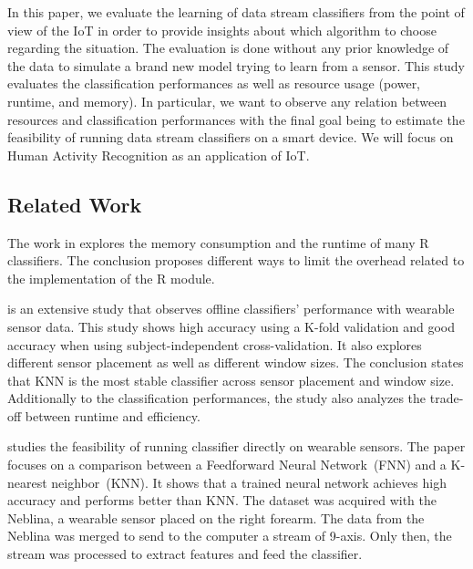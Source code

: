 In this paper, we evaluate the learning of data stream classifiers from the
point of view of the IoT in order to provide insights about which algorithm
to choose regarding the situation. The evaluation is done without any prior
knowledge of the data to simulate a brand new model trying to learn from a
sensor. This study evaluates the classification performances as well as
resource usage (power, runtime, and memory). In particular, we want to observe
any relation between resources and classification performances with the final
goal being to estimate the feasibility of running data stream classifiers on a
smart device. We will focus on Human Activity Recognition as an application of IoT.


\subsection{Related Work}
The work in \cite{memory_consumption_machine_learning}
explores the memory consumption and
the runtime of many R classifiers. The conclusion proposes different ways to
limit the overhead related to the implementation of the R module.

\cite{Janidarmian_2017} is an extensive study that
observes offline classifiers' performance with
wearable sensor data. This study shows high
accuracy using a K-fold validation and good
accuracy when using subject-independent
cross-validation. It also explores different
sensor placement as well as different window
sizes. The conclusion states that KNN is the most
stable classifier across sensor placement and
window size. Additionally to the classification
performances, the study also analyzes the
trade-off between runtime and efficiency.

\cite{omid_2019} studies the feasibility of
running classifier directly on wearable sensors.
The paper focuses on a comparison between a
Feedforward Neural Network~(FNN) and a K-nearest
neighbor~(KNN). It shows that a trained neural
network achieves high accuracy and performs better
than KNN. The dataset was acquired with the
Neblina, a wearable sensor placed on the right
forearm. The data from the Neblina was merged to
send to the computer a stream of 9-axis. Only
then, the stream was processed to extract features
and feed the classifier.


